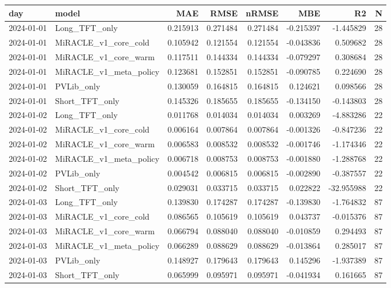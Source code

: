 \begin{tabular}{llrrrrrr}
\toprule
day & model & MAE & RMSE & nRMSE & MBE & R2 & N \\
\midrule
2024-01-01 & Long_TFT_only & 0.215913 & 0.271484 & 0.271484 & -0.215397 & -1.445829 & 28 \\
2024-01-01 & MiRACLE_v1_core_cold & 0.105942 & 0.121554 & 0.121554 & -0.043836 & 0.509682 & 28 \\
2024-01-01 & MiRACLE_v1_core_warm & 0.117511 & 0.144334 & 0.144334 & -0.079297 & 0.308684 & 28 \\
2024-01-01 & MiRACLE_v1_meta_policy & 0.123681 & 0.152851 & 0.152851 & -0.090785 & 0.224690 & 28 \\
2024-01-01 & PVLib_only & 0.130059 & 0.164815 & 0.164815 & 0.124621 & 0.098566 & 28 \\
2024-01-01 & Short_TFT_only & 0.145326 & 0.185655 & 0.185655 & -0.134150 & -0.143803 & 28 \\
2024-01-02 & Long_TFT_only & 0.011768 & 0.014034 & 0.014034 & 0.003269 & -4.883286 & 22 \\
2024-01-02 & MiRACLE_v1_core_cold & 0.006164 & 0.007864 & 0.007864 & -0.001326 & -0.847236 & 22 \\
2024-01-02 & MiRACLE_v1_core_warm & 0.006583 & 0.008532 & 0.008532 & -0.001746 & -1.174346 & 22 \\
2024-01-02 & MiRACLE_v1_meta_policy & 0.006718 & 0.008753 & 0.008753 & -0.001880 & -1.288768 & 22 \\
2024-01-02 & PVLib_only & 0.004542 & 0.006815 & 0.006815 & -0.002890 & -0.387557 & 22 \\
2024-01-02 & Short_TFT_only & 0.029031 & 0.033715 & 0.033715 & 0.022822 & -32.955988 & 22 \\
2024-01-03 & Long_TFT_only & 0.139830 & 0.174287 & 0.174287 & -0.139830 & -1.764832 & 87 \\
2024-01-03 & MiRACLE_v1_core_cold & 0.086565 & 0.105619 & 0.105619 & 0.043737 & -0.015376 & 87 \\
2024-01-03 & MiRACLE_v1_core_warm & 0.066794 & 0.088040 & 0.088040 & -0.010859 & 0.294493 & 87 \\
2024-01-03 & MiRACLE_v1_meta_policy & 0.066289 & 0.088629 & 0.088629 & -0.013864 & 0.285017 & 87 \\
2024-01-03 & PVLib_only & 0.148927 & 0.179643 & 0.179643 & 0.145296 & -1.937389 & 87 \\
2024-01-03 & Short_TFT_only & 0.065999 & 0.095971 & 0.095971 & -0.041934 & 0.161665 & 87 \\

\end{tabular}
